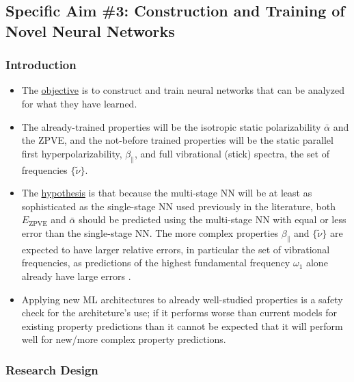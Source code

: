 \documentclass[12pt]{article}
\begin{document}
\subsection{Specific Aim \#3: Construction and Training of Novel Neural Networks}
\label{sec:orga3cdaa4}

\subsubsection{Introduction}
\label{sec:org966c871}

\begin{itemize}
\item The \uline{objective} is to construct and train neural networks that can be analyzed for what they have learned.

\item The already-trained properties will be the isotropic static polarizability \(\bar{\alpha}\) and the ZPVE, and the not-before trained properties will be the static parallel first hyperpolarizability, \(\beta_{\parallel}\), and full vibrational (stick) spectra, the set of frequencies \(\{\tilde{\nu}\}\).

\item The \uline{hypothesis} is that because the multi-stage NN will be at least as sophisticated as the single-stage NN used previously in the literature, both \(E_{\text{ZPVE}}\) and \(\bar{\alpha}\) should be predicted using the multi-stage NN with equal or less error than the single-stage NN. The more complex properties \(\beta_{\parallel}\) and \(\{\tilde{\nu}\}\) are expected to have larger relative errors, in particular the set of vibrational frequencies, as predictions of the highest fundamental frequency \(\omega_1\) alone already have large errors \cite{2017arXiv170205532F}.

\item Applying new ML architectures to already well-studied properties is a safety check for the architeture's use; if it performs worse than current models for existing property predictions than it cannot be expected that it will perform well for new/more complex property predictions.
\end{itemize}

\subsubsection{Research Design}
\label{sec:orgcd41bf5}
\end{document}
